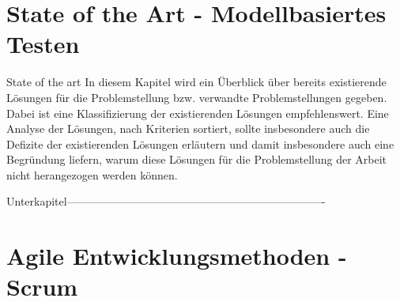 \section{State of the Art - Modellbasiertes Testen}

State of the art
In diesem Kapitel wird ein Überblick über bereits existierende Lösungen für die Problemstellung bzw. verwandte Problemstellungen gegeben. Dabei ist eine Klassifizierung der existierenden Lösungen empfehlenswert. Eine Analyse der Lösungen, nach Kriterien sortiert, sollte insbesondere auch die Defizite der existierenden Lösungen erläutern und damit insbesondere auch eine Begründung liefern, warum diese Lösungen für die Problemstellung der Arbeit nicht herangezogen werden können.

Unterkapitel----------------------------------------------------------------------

\section{Agile Entwicklungsmethoden - Scrum}